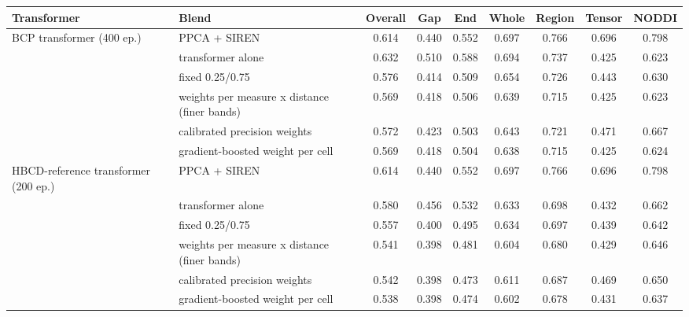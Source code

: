 \begin{tabular}{llccccccc}
\toprule
Transformer & Blend & Overall & Gap & End & Whole & Region & Tensor & NODDI \\
\midrule
BCP transformer (400 ep.) & PPCA + SIREN & 0.614 & 0.440 & 0.552 & 0.697 & 0.766 & 0.696 & 0.798 \\
 & transformer alone & 0.632 & 0.510 & 0.588 & 0.694 & 0.737 & 0.425 & 0.623 \\
 & fixed 0.25/0.75 & 0.576 & 0.414 & 0.509 & 0.654 & 0.726 & 0.443 & 0.630 \\
 & weights per measure x distance (finer bands) & 0.569 & 0.418 & 0.506 & 0.639 & 0.715 & 0.425 & 0.623 \\
 & calibrated precision weights & 0.572 & 0.423 & 0.503 & 0.643 & 0.721 & 0.471 & 0.667 \\
 & gradient-boosted weight per cell & 0.569 & 0.418 & 0.504 & 0.638 & 0.715 & 0.425 & 0.624 \\
\addlinespace[2pt]
HBCD-reference transformer (200 ep.) & PPCA + SIREN & 0.614 & 0.440 & 0.552 & 0.697 & 0.766 & 0.696 & 0.798 \\
 & transformer alone & 0.580 & 0.456 & 0.532 & 0.633 & 0.698 & 0.432 & 0.662 \\
 & fixed 0.25/0.75 & 0.557 & 0.400 & 0.495 & 0.634 & 0.697 & 0.439 & 0.642 \\
 & weights per measure x distance (finer bands) & 0.541 & 0.398 & 0.481 & 0.604 & 0.680 & 0.429 & 0.646 \\
 & calibrated precision weights & 0.542 & 0.398 & 0.473 & 0.611 & 0.687 & 0.469 & 0.650 \\
 & gradient-boosted weight per cell & 0.538 & 0.398 & 0.474 & 0.602 & 0.678 & 0.431 & 0.637 \\
\bottomrule
\end{tabular}
